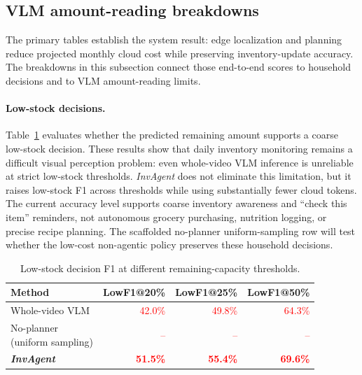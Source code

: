\documentclass[sigconf,anonymous,nonacm]{acmart}
\newcommand{\scaffold}[1]{\textcolor{red}{#1}}
\newcommand{\sys}{\textit{InvAgent}\xspace}
\begin{document}
\subsection{VLM amount-reading breakdowns}
\label{sec:crosscut}

The primary tables establish the system result: edge localization and
planning reduce projected monthly cloud cost while preserving
inventory-update accuracy.
The breakdowns in this subsection connect those end-to-end scores to
household decisions and to VLM amount-reading limits.

\paragraph{Low-stock decisions.}
Table~\ref{tab:low-stock-f1} evaluates whether the predicted remaining
amount supports a coarse low-stock decision. These results show that
daily inventory monitoring remains a difficult visual perception
problem: even whole-video VLM inference is unreliable at strict
low-stock thresholds. \sys does not eliminate this limitation, but it
raises low-stock F1 across thresholds while using substantially fewer
cloud tokens. The current accuracy level supports coarse inventory
awareness and ``check this item'' reminders, not autonomous grocery
purchasing, nutrition logging, or precise recipe planning. The
scaffolded no-planner uniform-sampling row will test whether the
low-cost non-agentic policy preserves these household decisions.

\begin{table}[!htbp]
\centering
\small
\caption{Low-stock decision F1 at different remaining-capacity thresholds.}
\label{tab:low-stock-f1}
\begin{tabular}{lrrr}
\toprule
Method & LowF1@20\% & LowF1@25\% & LowF1@50\% \\
\midrule
Whole-video VLM & \scaffold{42.0\%} & \scaffold{49.8\%} & \scaffold{64.3\%} \\
\makecell[l]{No-planner\\(uniform sampling)} & \scaffold{--} & \scaffold{--} & \scaffold{--} \\
\textbf{\sys} & \scaffold{\textbf{51.5\%}} & \scaffold{\textbf{55.4\%}} & \scaffold{\textbf{69.6\%}} \\
\bottomrule
\end{tabular}
\end{table}
\end{document}
